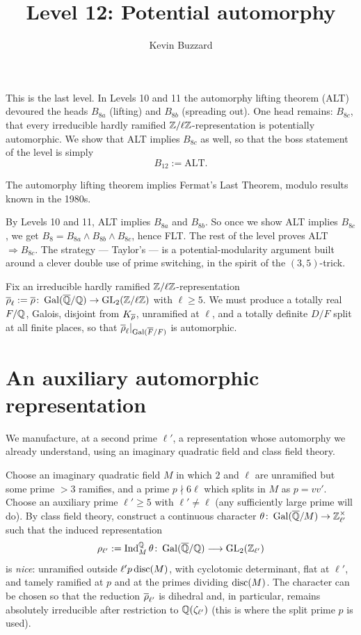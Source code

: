 \documentclass[11pt]{article}
\title{Level 12: Potential automorphy}
\author{Kevin Buzzard}
\date{}
\begin{document}
\maketitle

\noindent
This is the last level. In Levels 10 and 11 the automorphy lifting theorem
(ALT) devoured the heads $B_{8a}$ (lifting) and $B_{8b}$ (spreading out). One
head remains: $B_{8c}$, that every irreducible hardly ramified
$\mathbb{Z}/\ell\mathbb{Z}$-representation is potentially automorphic. We show that ALT implies
$B_{8c}$ as well, so that the boss statement of the level is simply
\[
  B_{12} := \text{ALT}.
\]

\begin{theorem}\label{thm:boss12}
The automorphy lifting theorem implies Fermat's Last Theorem, modulo results
known in the 1980s.
\end{theorem}

By Levels 10 and 11, ALT implies $B_{8a}$ and $B_{8b}$. So once we show ALT
implies $B_{8c}$, we get $B_8=B_{8a}\wedge B_{8b}\wedge B_{8c}$, hence FLT. The
rest of the level proves ALT $\Rightarrow B_{8c}$. The strategy --- Taylor's ---
is a potential-modularity argument built around a clever double use of prime
switching, in the spirit of the $(3,5)$-trick.

Fix an irreducible hardly ramified $\mathbb{Z}/\ell\mathbb{Z}$-representation
$\overline{\rho}_\ell:=\overline{\rho}\colon\operatorname{Gal}(\overline{\mathbb{Q}}/\mathbb{Q})\to\operatorname{GL}_2(\mathbb{Z}/\ell\mathbb{Z})$ with $\ell\geq5$. We must
produce a totally real $F/\mathbb{Q}$, Galois, disjoint from $K_{\overline{\rho}}$, unramified
at $\ell$, and a totally definite $D/F$ split at all finite places, so that
$\overline{\rho}_\ell|_{\operatorname{Gal}(\overline{F}/F)}$ is automorphic.

\section{An auxiliary automorphic representation}

We manufacture, at a second prime $\ell'$, a representation whose automorphy we
already understand, using an imaginary quadratic field and class field theory.

Choose an imaginary quadratic field $M$ in which $2$ and $\ell$ are unramified
but some prime $>3$ ramifies, and a prime $p\nmid6\ell$ which splits in $M$ as
$p=vv'$. Choose an auxiliary prime $\ell'\geq5$ with $\ell'\neq\ell$ (any
sufficiently large prime will do). By class field theory, construct a
continuous character $\theta\colon\operatorname{Gal}(\overline{\mathbb{Q}}/M)\to\mathbb{Z}_{\ell'}^\times$ such that
the induced representation
\[
  \rho_{\ell'}:=\operatorname{Ind}_{M}^{\mathbb{Q}}\theta\colon\operatorname{Gal}(\overline{\mathbb{Q}}/\mathbb{Q})\longrightarrow\operatorname{GL}_2(\mathbb{Z}_{\ell'})
\]
is \emph{nice}: unramified outside $\ell'p\operatorname{disc}(M)$, with cyclotomic
determinant, flat at $\ell'$, and tamely ramified at $p$ and at the primes
dividing $\operatorname{disc}(M)$. The character can be chosen so that the reduction
$\overline{\rho}_{\ell'}$ is dihedral and, in particular, remains absolutely irreducible
after restriction to $\mathbb{Q}(\zeta_{\ell'})$ (this is where the split prime $p$ is
used).
\end{document}
